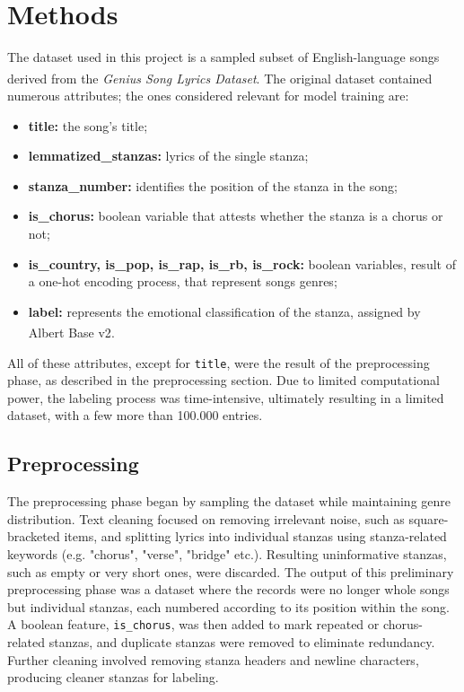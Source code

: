 \chapter*{Methods}
\label{ch:capitolo2}
The dataset used in this project is a sampled subset of English-language
songs derived from the \textit{Genius Song Lyrics Dataset}\textsuperscript{\cite{geniusdataset}}.
The original dataset contained numerous attributes; the ones considered
relevant for model training are:
\begin{itemize}
    \item \textbf{title:} the song's title;
    
    \item \textbf{lemmatized\_stanzas:} lyrics of the single stanza;
    
    \item \textbf{stanza\_number:} identifies the position of the stanza in the song;

    \item \textbf{is\_chorus:} boolean variable that attests whether the stanza is
        a chorus or not;
    
    \item \textbf{is\_country, is\_pop, is\_rap, is\_rb, is\_rock:} boolean variables, result of a one-hot encoding process, that represent songs genres;

    \item \textbf{label:} represents the emotional classification of the stanza,
        assigned by Albert Base v2\textsuperscript{\cite{albert-base-v2}}.
\end{itemize}
All of these attributes, except for \texttt{title}, were the result
of the preprocessing phase, as described in the preprocessing section.
Due to limited computational power, the labeling process was time-intensive,
ultimately resulting in a limited dataset, with a few more than 100.000 entries.

\section*{Preprocessing}
\label{preprocessing}
The preprocessing phase began by sampling the dataset while maintaining genre
distribution. Text cleaning focused on removing irrelevant noise, such as
square-bracketed items, and splitting lyrics into individual stanzas using
stanza-related keywords (e.g. "chorus", "verse", "bridge" etc.).
Resulting uninformative stanzas, such as empty or very short ones, were discarded.
The output of this preliminary preprocessing phase was a dataset
where the records were no longer whole songs but individual stanzas, each
numbered according to its position within the song.
A boolean feature, \texttt{is\_chorus}, was then added to mark repeated or chorus-related
stanzas, and duplicate stanzas were removed to eliminate redundancy.
Further cleaning involved removing stanza headers and newline characters,
producing cleaner stanzas for labeling.\\

